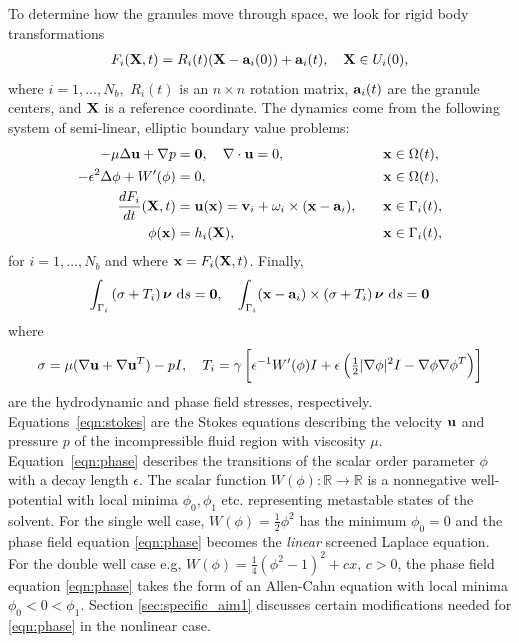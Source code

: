 To determine how the granules move through space,
we look for rigid body transformations
\begin{align}
\label{eq:RBT}
  F_i(\XX,t) = R_i(t)(\XX - \aa_i(0)) + \aa_i(t),\quad \XX \in U_i(0),
\end{align}
where $i = 1,\ldots,N_b,$ $R_i(t)$ is an $n
\times n$ rotation matrix, $\aa_i(t)$ are the granule centers, and $\XX$ is a
reference coordinate.
The dynamics come from the following system of semi-linear, elliptic boundary value problems:
\begin{alignat}{4}
  \label{eqn:stokes} 
  -\mu\Delta \uu + \nabla p &= \mathbf{0}, 
  \quad \nabla \cdot \uu = 0, &&\xx \in \Omega(t), \\
  \label{eqn:phase}
  -\epsilon^2 \Delta \phi + W'(\phi) &= 0, &&\xx \in \Omega(t),\\
  \label{eqn:noslip}        
  \frac{dF_i}{dt}(\XX,t) & = \uu(\xx) = 
    \vv_i + \omega_i \times (\xx - \aa_i), 
  \quad &&\xx \in \Gamma_i(t),\\
  \label{eqn:material}
  \phi(\xx) &= h_i(\XX),  &&\xx \in \Gamma_i(t),
\end{alignat}
for $i=1,\ldots,N_b$ and where $\xx = F_i(\XX,t)$.  Finally,
\begin{align}
\label{eqn:stressbalance}
\int_{\Gamma_i} \left(\sigma  + T_i\right)\nnu \,\dif s = \mathbf{0},\quad
\int_{\Gamma_i} (\xx - \aa_i)\times \left(\sigma + T_i\right) \nnu \,\dif s = \mathbf{0}
\end{align}
where
\begin{align}
\label{eqn:hydro_stress}
\sigma = \mu(\nabla \uu + \nabla \uu^T) - pI,\quad 
T_i = \gamma\left[\epsilon^{-1} W'(\phi)I
  + \epsilon\left(\tfrac{1}{2}|\nabla \phi|^2I - \nabla \phi \nabla
  \phi^T\right)\right]
\end{align}
are the hydrodynamic and phase field stresses, respectively.
Equations~\eqref{eqn:stokes} are the Stokes equations 
describing the velocity $\uu$ and pressure $p$ of
the incompressible fluid region with viscosity $\mu$.
Equation~\eqref{eqn:phase} describes the
transitions of the scalar order parameter $\phi$ with a decay length
$\epsilon$.
The scalar function $W(\phi) : \mathbb{R} \to \mathbb{R}$ is a nonnegative
well-potential with local minima $\phi_0, \phi_1$  etc.
representing metastable states of the solvent.
For the single well case, $W(\phi) = \frac{1}{2}\phi^2$
has the minimum $\phi_0 = 0$ and the phase field equation
\eqref{eqn:phase} becomes the \emph{linear} screened Laplace equation.
For the double well case e.g, $W(\phi) = \frac{1}{4}(\phi^2-1)^2+cx$, $c > 0$,
the phase field equation \eqref{eqn:phase} takes the form of an
Allen-Cahn equation with local minima $\phi_0 < 0 < \phi_1$.
Section \ref{sec:specific_aim1} discusses certain
modifications needed for \eqref{eqn:phase} in the nonlinear case.

